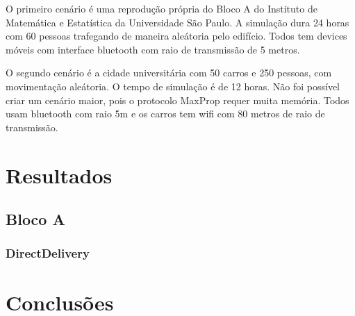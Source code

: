 \documentclass[conference]{IEEEtran}
\begin{document}
  O primeiro cenário é uma reprodução própria do Bloco A do Instituto de Matemática e Estatística da Universidade São Paulo. A simulação
dura 24 horas com 60 pessoas trafegando de maneira aleátoria pelo edifício. Todos tem devices móveis com interface bluetooth com raio de
transmissão de 5 metros.

  O segundo cenário é a cidade universitária com 50 carros e 250 pessoas, com movimentação aleátoria. O tempo de simulação é de 12 horas.
Não foi possível criar um cenário maior, pois o protocolo MaxProp requer muita memória. Todos usam bluetooth com raio 5m e os carros tem wifi
com 80 metros de raio de transmissão.

\section{Resultados}

\subsection*{Bloco A}

\subsubsection*{DirectDelivery} 

\section{Conclusões}
\end{document}
